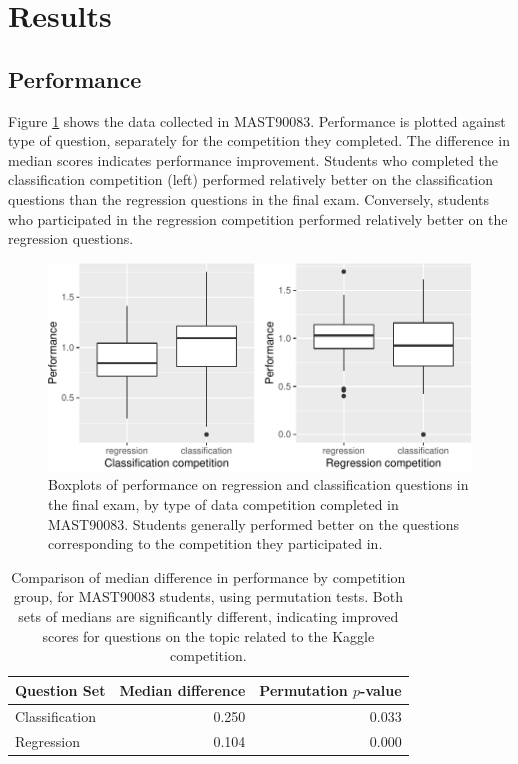 \documentclass[12pt]{article}
\begin{document}
\section{Results}\label{results}

\subsection{Performance}\label{performance-1}

Figure \ref{fig:MAST90083} shows the data collected in MAST90083.
Performance is plotted against type of question, separately for the
competition they completed. The difference in median scores indicates
performance improvement. Students who completed the classification
competition (left) performed relatively better on the classification
questions than the regression questions in the final exam. Conversely,
students who participated in the regression competition performed
relatively better on the regression questions.

\begin{figure}
\centering
\includegraphics{paper-kaggle_files/figure-latex/Melb-1.pdf}
\caption{\label{fig:MAST90083} Boxplots of performance on regression and
classification questions in the final exam, by type of data competition
completed in MAST90083. Students generally performed better on the
questions corresponding to the competition they participated in.}
\end{figure}

\begin{table}[h]
\begin{center}
\begin{tabular}{|l|r|r|}\hline
Question Set & Median difference & Permutation $p$-value \\\hline
Classification & 0.250 & 0.033\\
Regression & 0.104 & 0.000\\\hline
\end{tabular}
\caption{Comparison of median difference in performance by competition group, for MAST90083 students, using permutation tests. Both sets of medians are significantly different, indicating improved scores for questions on the topic related to the Kaggle competition.}
\end{center}
\label{tab:Melb_Perm}
\end{table}
\end{document}
